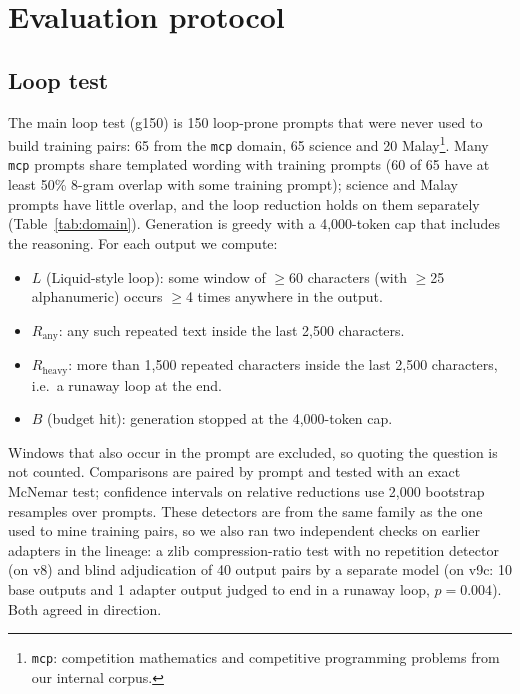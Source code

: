 \documentclass[11pt]{article}
\newcommand{\Rany}{R_{\text{any}}}
\newcommand{\Rheavy}{R_{\text{heavy}}}
\begin{document}
\section{Evaluation protocol}
\label{sec:eval}

\subsection{Loop test}

The main loop test (g150) is 150 loop-prone prompts that were never used to build training pairs: 65 from the \texttt{mcp} domain, 65 science and 20 Malay\footnote{\texttt{mcp}: competition mathematics and competitive programming problems from our internal corpus.}. Many \texttt{mcp} prompts share templated wording with training prompts (60 of 65 have at least 50\% 8-gram overlap with some training prompt); science and Malay prompts have little overlap, and the loop reduction holds on them separately (Table~\ref{tab:domain}). Generation is greedy with a 4,000-token cap that includes the reasoning. For each output we compute:

\begin{itemize}
  \item $L$ (Liquid-style loop): some window of $\geq$60 characters (with $\geq$25 alphanumeric) occurs $\geq$4 times anywhere in the output.
  \item $\Rany$: any such repeated text inside the last 2,500 characters.
  \item $\Rheavy$: more than 1,500 repeated characters inside the last 2,500 characters, i.e.\ a runaway loop at the end.
  \item $B$ (budget hit): generation stopped at the 4,000-token cap.
\end{itemize}

Windows that also occur in the prompt are excluded, so quoting the question is not counted. Comparisons are paired by prompt and tested with an exact McNemar test; confidence intervals on relative reductions use 2,000 bootstrap resamples over prompts. These detectors are from the same family as the one used to mine training pairs, so we also ran two independent checks on earlier adapters in the lineage: a zlib compression-ratio test with no repetition detector (on v8) and blind adjudication of 40 output pairs by a separate model (on v9c: 10 base outputs and 1 adapter output judged to end in a runaway loop, $p=0.004$). Both agreed in direction.
\end{document}
